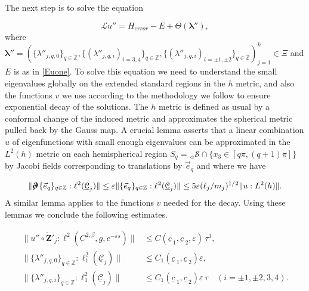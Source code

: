 \documentclass[12pt,namelimits,sumlimits]{amsart}
\theoremstyle{remark}
\numberwithin{equation}{section}
\begin{document}
The next step is
to solve the equation
\addtocounter{theorem}{1}
\begin{equation}
\label{Eutwo}
{\ensuremath{\mathcal L}} u''= {{H_{error}}} - E + \Theta({\boldsymbol{\lambda}}''),
\end{equation}
where
$
{\boldsymbol{\lambda}}''=
\left(
\{\lambda''_{{{j,q}},0}\}_{q\in{\mathbb{Z}}},
\{(\lambda''_{{{j,q}},i})_{i=3,4}\}_{q\in{\mathbb{Z}}},
\{(\lambda''_{{{j,q}},i})_{{i=\pm1,\pm2}}\}_{q\in{\mathbb{Z}}}
\right)_{j=1}^k
\in\Xi
$
and $E$ is as in \ref{Euone}.
To solve this equation we need to understand the small eigenvalues globally on the extended standard regions
in the $h$ metric,
and also the functions $v$ we use according to the methodology we follow
to ensure exponential decay of the solutions.
The $h$ metric is defined as usual by a conformal change of the induced metric and approximates the spherical metric
pulled back by the Gauss map.
A crucial lemma asserts that a linear combination $u$ of eigenfunctions with small enough eigenvalues 
can be approximated in the $L^2(h)$ metric on each hemispherical region 
$
S_q={{{}_{\,\alpha\!}\mathcal{S}}}\cap\{x_3\in[q\pi,(q+1)\pi]\}
$
by Jacobi fields corresponding to translations by ${\vec{e}}_q$
and where we have
\addtocounter{theorem}{1}
\begin{equation}
\label{Eddkernel}
\|{{\boldsymbol{\partial}\mspace{.8mu}\!\!\!\!\boldsymbol{/}\,}}\{{\vec{e}}_q\}_{q\in{\mathbb{Z}}}:\ell^2({\underline{{\mathcal{C}}}}_j)\|\le
\varepsilon \|\{{\vec{e}}_q\}_{q\in{\mathbb{Z}}}:\ell^2({\underline{{\mathcal{C}}}}_j)\|
\le 5\varepsilon (\ell_j/m_j)^{1/2}
\|u:L^2(h)\|
.
\end{equation}
A similar lemma applies to the functions $v$ needed for the decay.
Using these lemmas we conclude the following estimates.
\addtocounter{theorem}{1}
\begin{equation}
\label{Euppestimates}
\begin{aligned}
\|u''
\circ {\widetilde{\boldsymbol{Z}}}'_j
:
\ell^2(C^{2,\beta},g,e^{-\varepsilon s})
\|
&\le
C({\underline{c}\,}_1,{\underline{c}\,}_2,\varepsilon)\,\tau^3,
\\
\|\{\lambda''_{{{j,q}},0}\}_{q\in{\mathbb{Z}}}:\ell^2_1({\underline{{\mathcal{C}}}}_j)\|
&\le C_1({\underline{c}\,}_1,{\underline{c}\,}_2)\varepsilon,
\\
\|\{\lambda''_{{{j,q}},i}\}_{q\in{\mathbb{Z}}}:\ell^2_1({\underline{{\mathcal{C}}}}_j)\|
&\le C_1({\underline{c}\,}_1,{\underline{c}\,}_2)\varepsilon\,\tau
\quad
({{i=\pm1,\pm2}},3,4).
\end{aligned}
\end{equation}
\end{document}
